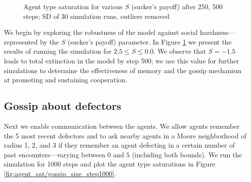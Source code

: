 \documentclass[english]{article}
\begin{document}
\begin{figure}[!ht]
  \centering
  \caption{Agent type saturation for various $S$ (sucker's payoff) after 250, 500 steps; SD of 30 simulation runs, outliers removed}
  \label{fig:agent_sat/S-memory0gossip0}
\end{figure}

We begin by exploring the robustness of the model against social harshness---represented by the $S$ (sucker's payoff) parameter.
In Figure \ref{fig:agent_sat/S-memory0gossip0} we present the results of running the simulation for $2.5 \leq S \leq 0.0$.
We observe that $S = -1.5$ leads to total extinction in the model by step 500;
we use this value for further simulations to determine the effectiveness of memory and the gossip mechanism at promoting and sustaining cooperation.


\subsection{Gossip about defectors}
Next we enable communication between the agents.
We allow agents remember the 5 most recent defectors and to ask nearby agents in a Moore neighborhood of radius 1, 2, and 3 if they remember an agent defecting in a certain number of past encounters---varying between $0$ and $5$ (including both bounds).
We run the simulation for 1000 steps and plot the agent type saturations in Figure \ref{fig:agent_sat/gossip_size_step1000}.
\end{document}
